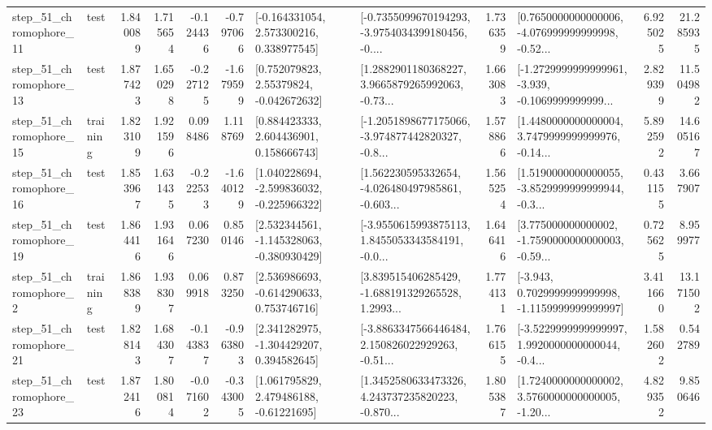 \begin{tabular}{llrrrrllrlrr}
   step\_51\_chromophore\_11 &      test &      1.840089 &    1.715654 &     -0.124436 & -0.797066 &    [-0.164331054, 2.573300216, 0.338977545] &  [-0.7355099670194293, -3.9754034399180456, -0.... &       1.736359 &  [0.7650000000000006, -4.076999999999998, -0.52... &            6.925025 &         21.285935 \\
   step\_51\_chromophore\_13 &      test &      1.877423 &    1.650298 &     -0.227125 & -1.679599 &     [0.752079823, 2.55379824, -0.042672632] &  [1.2882901180368227, 3.9665879265992063, -0.73... &       1.663083 &  [-1.2729999999999961, -3.939, -0.1069999999999... &            2.829399 &         11.504982 \\
   step\_51\_chromophore\_15 &  training &      1.823109 &    1.921596 &      0.098486 &  1.118769 &     [0.884423333, 2.604436901, 0.158666743] &  [-1.2051898677175066, -3.974877442820327, -0.8... &       1.578866 &  [1.4480000000000004, 3.7479999999999976, -0.14... &            5.892592 &         14.605167 \\
   step\_51\_chromophore\_16 &      test &      1.853967 &    1.631435 &     -0.222533 & -1.640129 &   [1.040228694, -2.599836032, -0.225966322] &  [1.562230595332654, -4.026480497985861, -0.603... &       1.565254 &  [1.5190000000000055, -3.8529999999999944, -0.3... &            0.431155 &          3.667907 \\
   step\_51\_chromophore\_19 &      test &      1.864416 &    1.931646 &      0.067230 &  0.850146 &   [2.532344561, -1.145328063, -0.380930429] &  [-3.9550615993875113, 1.8455053343584191, -0.0... &       1.646416 &  [3.775000000000002, -1.7590000000000003, -0.59... &            0.725625 &          8.959977 \\
    step\_51\_chromophore\_2 &  training &      1.868389 &    1.938307 &      0.069918 &  0.873250 &    [2.536986693, -0.614290633, 0.753746716] &  [3.839515406285429, -1.688191329265528, 1.2993... &       1.774131 &  [-3.943, 0.7029999999999998, -1.1159999999999997] &            3.411660 &         13.171502 \\
   step\_51\_chromophore\_21 &      test &      1.828143 &    1.684307 &     -0.143837 & -0.963803 &    [2.341282975, -1.304429207, 0.394582645] &  [-3.8863347566446484, 2.150826022929263, -0.51... &       1.766155 &  [-3.5229999999999997, 1.9920000000000044, -0.4... &            1.582602 &          0.542789 \\
   step\_51\_chromophore\_23 &      test &      1.872416 &    1.800814 &     -0.071602 & -0.343005 &     [1.061795829, 2.479486188, -0.61221695] &  [1.3452580633473326, 4.243737235820223, -0.870... &       1.805387 &  [1.7240000000000002, 3.5760000000000005, -1.20... &            4.829352 &          9.850646 \\

\end{tabular}
